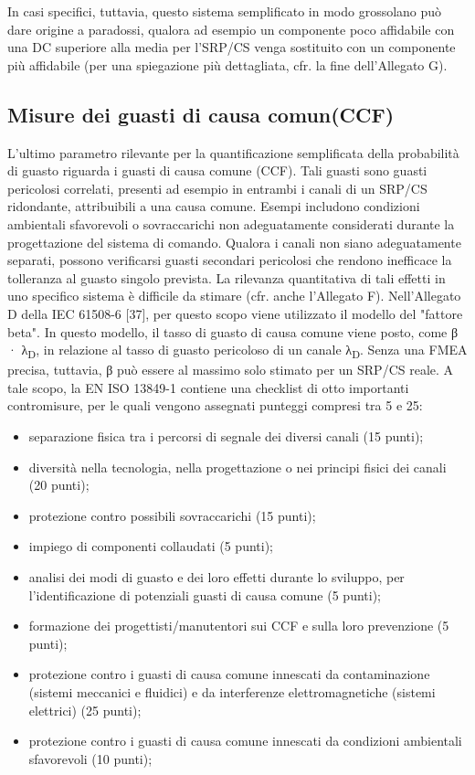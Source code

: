 In casi specifici, tuttavia, questo sistema semplificato in modo grossolano può dare origine a paradossi, qualora ad esempio un componente poco affidabile con una DC superiore alla media per l'SRP/CS venga sostituito con un componente più affidabile (per una spiegazione più dettagliata, cfr. la fine dell'Allegato G).

\subsection{Misure dei guasti di causa comun(CCF)}
\label{subsec:06-2-15}
L'ultimo parametro rilevante per la quantificazione semplificata della probabilità di guasto riguarda i guasti di causa comune (CCF). Tali guasti sono guasti pericolosi correlati, presenti ad esempio in entrambi i canali di un SRP/CS ridondante, attribuibili a una causa comune. Esempi includono condizioni ambientali sfavorevoli o sovraccarichi non adeguatamente considerati durante la progettazione del sistema di comando. Qualora i canali non siano adeguatamente separati, possono verificarsi guasti secondari pericolosi che rendono inefficace la tolleranza al guasto singolo prevista. La rilevanza quantitativa di tali effetti in uno specifico sistema è difficile da stimare (cfr. anche l'Allegato F). Nell'Allegato D della IEC 61508-6 [37], per questo scopo viene utilizzato il modello del "fattore beta". In questo modello, il tasso di guasto di causa comune viene posto, come β · λ\textsubscript{D}, in relazione al tasso di guasto pericoloso di un canale λ\textsubscript{D}. Senza una FMEA precisa, tuttavia, β può essere al massimo solo stimato per un SRP/CS reale. A tale scopo, la EN ISO 13849-1 contiene una checklist di otto importanti contromisure, per le quali vengono assegnati punteggi compresi tra 5 e 25:
\begin{itemize}
    \item separazione fisica tra i percorsi di segnale dei diversi canali (15 punti);
    \item diversità nella tecnologia, nella progettazione o nei principi fisici dei canali (20 punti);
    \item protezione contro possibili sovraccarichi (15 punti);
    \item impiego di componenti collaudati (5 punti);
    \item analisi dei modi di guasto e dei loro effetti durante lo sviluppo, per l'identificazione di potenziali guasti di causa comune (5 punti);
    \item formazione dei progettisti/manutentori sui CCF e sulla loro prevenzione (5 punti);
    \item protezione contro i guasti di causa comune innescati da contaminazione (sistemi meccanici e fluidici) e da interferenze elettromagnetiche (sistemi elettrici) (25 punti);
    \item protezione contro i guasti di causa comune innescati da condizioni ambientali sfavorevoli (10 punti);
\end{itemize}

